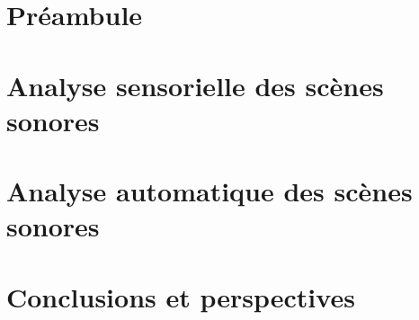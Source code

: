\documentclass[ twoside,openright,titlepage,numbers=noenddot,headinclude,%
                footinclude=true,cleardoublepage=empty,abstractoff, %
                BCOR=5mm,paper=a4,fontsize=11pt,%
                francais,ngerman,american%
                ]{scrreprt}
\begin{document}
\frenchspacing
\raggedbottom
{} %
\pagestyle{plain}




\cleardoublepage
\cleardoublepage
\cleardoublepage
\cleardoublepage
\pagestyle{scrheadings}
\cleardoublepage

\cleardoublepage{}

\cleardoublepage
{}
\part{Préambule}



\cleardoublepage
{}
\part{Analyse sensorielle des scènes sonores}




\cleardoublepage
{}
\part{Analyse automatique des scènes sonores}




\cleardoublepage
{}
\part{Conclusions et perspectives}



\appendix
\cleardoublepage
\end{document}
